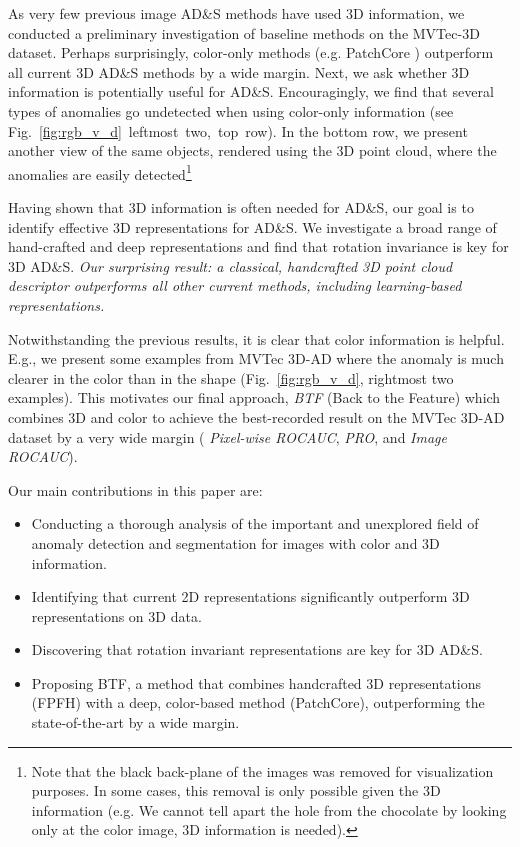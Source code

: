 \documentclass{article}
\begin{document}
As very few previous image AD\&S methods have used 3D information, we conducted a preliminary investigation of baseline methods on the MVTec-3D dataset. Perhaps surprisingly, color-only methods (e.g. PatchCore \cite{patchcore}) outperform all current 3D AD\&S methods by a wide margin. 
Next, we ask whether 3D information is potentially 
useful for AD\&S. Encouragingly, we find that several types of anomalies go undetected when using color-only information (see Fig.~\ref{fig:rgb_v_d}~leftmost~two,~top~row).
In the bottom row, we present another view of the same objects, rendered using the 3D point cloud, where the anomalies are easily detected\footnote[1]{Note that the black back-plane of the images was removed for visualization purposes. In some cases, this removal is only possible given the 3D information (e.g. We cannot tell apart the hole from the chocolate by looking only at the color image, 3D information is needed).}


Having shown that 3D information is often needed for AD\&S, our goal is to identify effective 3D representations for AD\&S.  We investigate a broad range of hand-crafted and deep representations and find that rotation invariance is key for 3D AD\&S. \textit{Our surprising result: a classical, handcrafted 3D point cloud descriptor outperforms all other current methods, including learning-based representations.}

Notwithstanding the previous results, it is clear that color information is helpful. E.g., we present some examples from MVTec 3D-AD where the anomaly is much clearer in the color than in the shape (Fig.~\ref{fig:rgb_v_d}, rightmost two examples). 
This motivates our final approach, \textit{BTF} (Back to the Feature) which combines 3D and color to achieve the best-recorded result on the MVTec 3D-AD dataset by a very wide margin ( \textit{Pixel-wise ROCAUC},  \textit{PRO}, and  \textit{Image ROCAUC}). 

Our main contributions in this paper are:
\begin{itemize}
    \item[] Conducting a thorough analysis of the important and unexplored field of anomaly detection and segmentation for images with color and 3D information.
    \item[] Identifying that current 2D representations significantly outperform 3D representations on 3D data.
    \item[] Discovering that rotation invariant representations are key for 3D AD\&S.
    \item[] Proposing BTF, a method that combines handcrafted 3D representations (FPFH) with a deep, color-based method (PatchCore), outperforming the state-of-the-art by a wide margin. 
\end{itemize}
\end{document}

